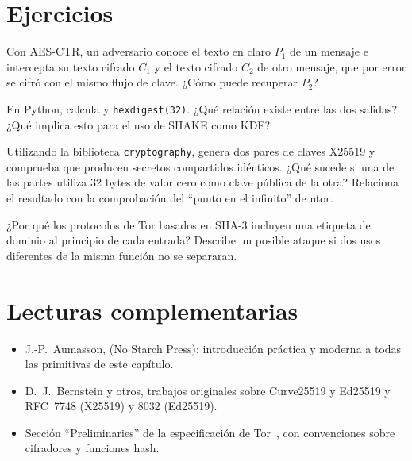 \section*{Ejercicios}

\begin{esercizio}[1]\label{es:05-xor}
Con AES-CTR, un adversario conoce el texto en claro $P_1$ de un mensaje e intercepta su texto cifrado $C_1$ y el texto cifrado $C_2$ de otro mensaje, que por error se cifró con el mismo flujo de clave. ¿Cómo puede recuperar $P_2$?
\end{esercizio}

\begin{esercizio}[1]\label{es:05-shake}
En Python, calcula  y \texttt{hexdigest(32)}. ¿Qué relación existe entre las dos salidas? ¿Qué implica esto para el uso de SHAKE como KDF?
\end{esercizio}

\begin{esercizio}[2]\label{es:05-dh}
Utilizando la biblioteca \texttt{cryptography}, genera dos pares de claves X25519 y comprueba que producen secretos compartidos idénticos. ¿Qué sucede si una de las partes utiliza 32 bytes de valor cero como clave pública de la otra? Relaciona el resultado con la comprobación del \enquote{punto en el infinito} de ntor.
\end{esercizio}

\begin{esercizio}[2]\label{es:05-etichette}
¿Por qué los protocolos de Tor basados en SHA-3 incluyen una etiqueta de dominio al principio de cada entrada? Describe un posible ataque si dos usos diferentes de la misma función no se separaran.
\end{esercizio}

\section*{Lecturas complementarias}
\begin{itemize}
  \item J.-P.~Aumasson,  (No Starch Press): introducción práctica y moderna a todas las primitivas de este capítulo.
  \item D.~J.~Bernstein y otros, trabajos originales sobre Curve25519 y Ed25519 y RFC~7748 (X25519) y 8032 (Ed25519).
  \item Sección \enquote{Preliminaries} de la especificación de Tor~\cite{torspec}, con convenciones sobre cifradores y funciones hash.
\end{itemize}
